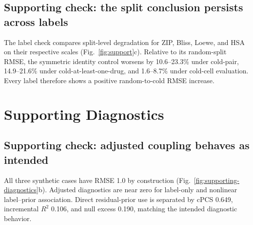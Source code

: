 \documentclass[conference]{IEEEtran}
\begin{document}
\begin{table}[!t]
\centering
\scriptsize
\caption{Three-seed NCI-ALMANAC random-split test results (mean $\pm$ SD).}
\label{tab:nci}
\end{table}

\subsection{Supporting check: the split conclusion persists across labels}

The label check compares split-level degradation for ZIP, Bliss, Loewe, and HSA on their respective scales (Fig.~\ref{fig:support}c). Relative to its random-split RMSE, the symmetric identity control worsens by 10.6--23.3\% under cold-pair, 14.9--21.6\% under cold-at-least-one-drug, and 1.6--8.7\% under cold-cell evaluation. Every label therefore shows a positive random-to-cold RMSE increase.

\section{Supporting Diagnostics}

\subsection{Supporting check: adjusted coupling behaves as intended}

All three synthetic cases have RMSE 1.0 by construction (Fig.~\ref{fig:supporting-diagnostics}b). Adjusted diagnostics are near zero for label-only and nonlinear label--prior association. Direct residual-prior use is separated by cPCS 0.649, incremental $R^2$ 0.106, and null excess 0.190, matching the intended diagnostic behavior.
\end{document}
